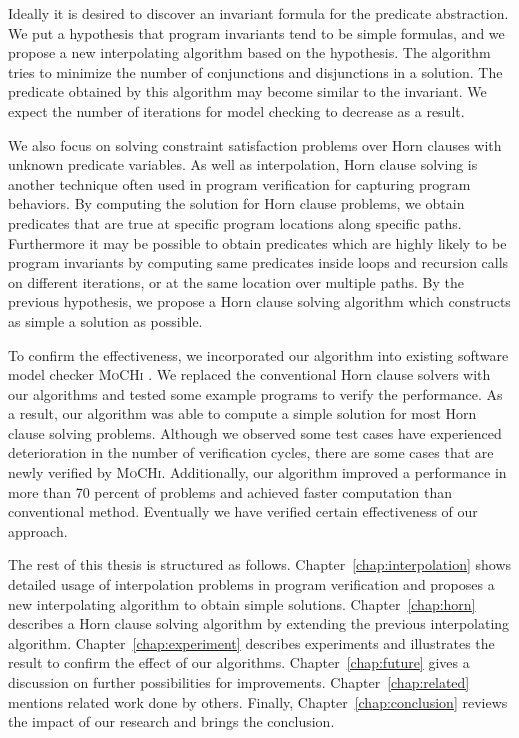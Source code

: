 Ideally it is desired to discover an invariant formula for the
predicate abstraction.  We put a hypothesis that program invariants
tend to be simple formulas, and we propose a new interpolating
algorithm based on the hypothesis.  The algorithm tries to minimize
the number of conjunctions and disjunctions in a solution.  The
predicate obtained by this algorithm may become similar to the
invariant. We expect the number of iterations for model checking to
decrease as a result.

We also focus on solving constraint satisfaction problems over Horn
clauses with unknown predicate variables.  As well as interpolation,
Horn clause solving is another technique often used in program
verification for capturing program behaviors.  By computing the
solution for Horn clause problems, we obtain predicates that are true
at specific program locations along specific paths.  Furthermore it
may be possible to obtain predicates which are highly likely to be
program invariants by computing same predicates inside loops and
recursion calls on different iterations, or at the same location over
multiple paths.  By the previous hypothesis, we propose a Horn clause
solving algorithm which constructs as simple a solution as possible.

To confirm the effectiveness, we incorporated our algorithm into
existing software model checker \textsc{MoCHi}
\cite{conf/pldi/KobayashiSU11}.  We replaced the conventional Horn
clause solvers with our algorithms and tested some example programs to
verify the performance.  As a result, our algorithm was able to
compute a simple solution for most Horn clause solving problems.
Although we observed some test cases have experienced deterioration in
the number of verification cycles, there are some cases that are newly
verified by \textsc{MoCHi}.  Additionally, our algorithm improved a
performance in more than 70 percent of problems and achieved faster
computation than conventional method.  Eventually we have verified
certain effectiveness of our approach.

The rest of this thesis is structured as follows.
Chapter~\ref{chap:interpolation} shows detailed usage of interpolation
problems in program verification and proposes a new interpolating
algorithm to obtain simple solutions.  Chapter~\ref{chap:horn}
describes a Horn clause solving algorithm by extending the previous
interpolating algorithm.  Chapter~\ref{chap:experiment} describes
experiments and illustrates the result to confirm the effect of our
algorithms.  Chapter~\ref{chap:future} gives a discussion on further
possibilities for improvements. Chapter~\ref{chap:related} mentions
related work done by others.  Finally, Chapter~\ref{chap:conclusion}
reviews the impact of our research and brings the conclusion.
